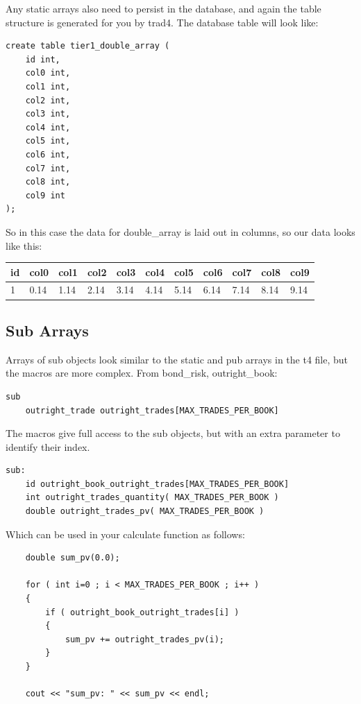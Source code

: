 \documentclass{report}
\begin{document}
Any static arrays also need to persist in the database, and again the table structure is generated for you 
by trad4. The database table will look like:

\begin{verbatim}
create table tier1_double_array (
    id int,
    col0 int,
    col1 int,
    col2 int,
    col3 int,
    col4 int,
    col5 int,
    col6 int,
    col7 int,
    col8 int,
    col9 int
);
\end{verbatim}

So in this case the data for double_array is laid out in columns, so our data looks like this:


\begin {tabular} {| l | l | l | l | l | l | l | l | l | l | l |}
\hline
id & col0 & col1 & col2 & col3 & col4 & col5 & col6 & col7 & col8 & col9 \\
\hline
1 & 0.14 & 1.14 & 2.14 & 3.14 & 4.14 & 5.14 & 6.14 & 7.14 & 8.14 & 9.14 \\
\hline
\end {tabular}


\subsection{Sub Arrays}

Arrays of sub objects look similar to the static and pub arrays in the t4 file, but the macros are more complex. From bond_risk, outright_book:

\begin{verbatim}
sub
    outright_trade outright_trades[MAX_TRADES_PER_BOOK]
\end{verbatim}

The macros give full access to the sub objects, but with an extra parameter to identify their index.

\begin{verbatim}
sub:
    id outright_book_outright_trades[MAX_TRADES_PER_BOOK]
    int outright_trades_quantity( MAX_TRADES_PER_BOOK )
    double outright_trades_pv( MAX_TRADES_PER_BOOK )
\end{verbatim}

Which can be used in your calculate function as follows:

\begin{verbatim}
    double sum_pv(0.0);
    
    for ( int i=0 ; i < MAX_TRADES_PER_BOOK ; i++ )
    {
        if ( outright_book_outright_trades[i] )
        {
            sum_pv += outright_trades_pv(i);
        }
    }

    cout << "sum_pv: " << sum_pv << endl;
\end{verbatim}
\end{document}
